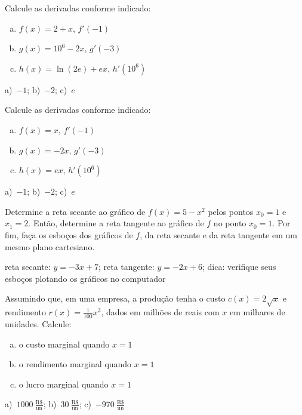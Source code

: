 \cleardoublepage\documentclass[../main.tex]{subfiles}
\begin{document}
\begin{exer}
  Calcule as derivadas conforme indicado:
  \begin{enumerate}[a)]
  \item $f(x) = 2 + x$, $f'(-1)$
  \item $g(x) = 10^6 - 2x$, $g'(-3)$
  \item $h(x) = \ln(2e) + ex$, $h'(10^6)$
  \end{enumerate}  
\end{exer}
\begin{resp}
  a)~$-1$; b)~$-2$; c)~$e$
\end{resp}

\begin{exer}
  Calcule as derivadas conforme indicado:
  \begin{enumerate}[a)]
  \item $f(x) = x$, $f'(-1)$
  \item $g(x) = -2x$, $g'(-3)$
  \item $h(x) = ex$, $h'(10^6)$
  \end{enumerate}  
\end{exer}
\begin{resp}
  a)~$-1$; b)~$-2$; c)~$e$
\end{resp}

\begin{exer}
  Determine a reta secante ao gráfico de $f(x) = 5-x^2$ pelos pontos $x_0=1$ e $x_1=2$. Então, determine a reta tangente ao gráfico de $f$ no ponto $x_0=1$. Por fim, faça os esboços dos gráficos de $f$, da reta secante e da reta tangente em um mesmo plano cartesiano.
\end{exer}
\begin{resp}
  reta secante: $y = -3x + 7$; reta tangente: $y = -2x + 6$; dica: verifique seus esboços plotando os gráficos no computador
\end{resp}

\begin{exer}
  Assumindo que, em uma empresa, a produção tenha o custo $c(x) = 2\sqrt{x}$ e rendimento $r(x) = \frac{1}{100}x^3$, dados em milhões de reais com $x$ em milhares de unidades. Calcule:
  \begin{enumerate}[a)]
  \item o custo marginal quando $x = 1$
  \item o rendimento marginal quando $x = 1$
  \item o lucro marginal quando $x=1$
  \end{enumerate}
\end{exer}
\begin{resp}
  a)~$1000~\frac{\text{R}\$}{\text{un}}$; b)~$30~\frac{\text{R\$}}{\text{un}}$; c)~$-970~\frac{\text{R\$}}{\text{un}}$
\end{resp}
\end{document}
